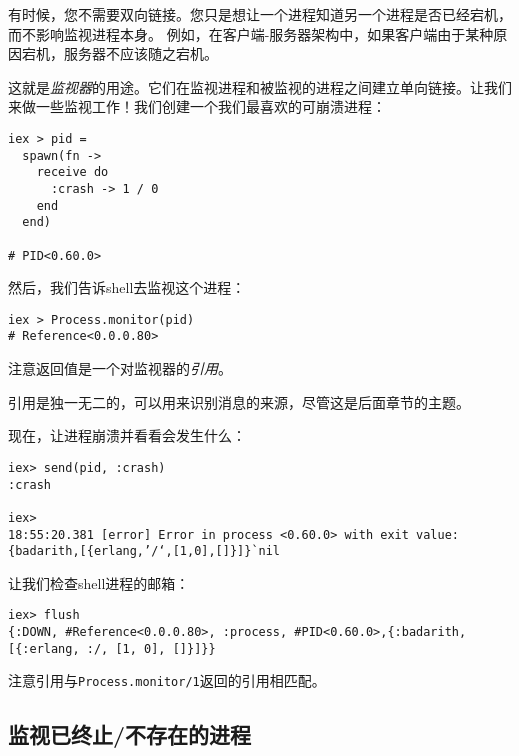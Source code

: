 有时候，您不需要双向链接。您只是想让一个进程知道另一个进程是否已经宕机，而不影响监视进程本身。
例如，在客户端-服务器架构中，如果客户端由于某种原因宕机，服务器不应该随之宕机。

这就是\emph{监视器}的用途。它们在监视进程和被监视的进程之间建立单向链接。让我们来做一些监视工作！我们创建一个我们最喜欢的可崩溃进程：

\begin{code}{}
\begin{verbatim}
iex > pid =
  spawn(fn ->
    receive do
      :crash -> 1 / 0
    end
  end)

# PID<0.60.0>
\end{verbatim}
\end{code}

然后，我们告诉shell去监视这个进程：

\begin{code}{}
\begin{verbatim}
iex > Process.monitor(pid)
# Reference<0.0.0.80>
\end{verbatim}
\end{code}

注意返回值是一个对监视器的\emph{引用}。

引用是独一无二的，可以用来识别消息的来源，尽管这是后面章节的主题。

现在，让进程崩溃并看看会发生什么：

\begin{code}{}
\begin{verbatim}
iex> send(pid, :crash)
:crash

iex>
18:55:20.381 [error] Error in process <0.60.0> with exit value: {badarith,[{erlang,’/‘,[1,0],[]}]}`nil
\end{verbatim}
\end{code}

让我们检查shell进程的邮箱：

\begin{code}{}
\begin{verbatim}
iex> flush
{:DOWN, #Reference<0.0.0.80>, :process, #PID<0.60.0>,{:badarith, [{:erlang, :/, [1, 0], []}]}}
\end{verbatim}
\end{code}

注意引用与\texttt{Process.monitor/1}返回的引用相匹配。

\subsection{监视已终止/不存在的进程}

